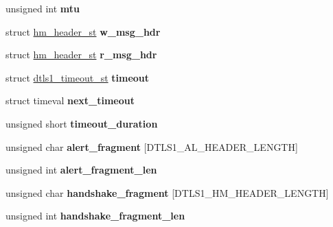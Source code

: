\begin{DoxyCompactItemize}
unsigned int {\bfseries mtu}
\item 
\mbox{\label{structdtls1__state__st_aa16e59d7f125177caa2b5939fcb13890}} 
struct \hyperlink{structhm__header__st}{hm\+\_\+header\+\_\+st} {\bfseries w\+\_\+msg\+\_\+hdr}
\item 
\mbox{\label{structdtls1__state__st_a1c6a7daa242306285d142a607d0a63b1}} 
struct \hyperlink{structhm__header__st}{hm\+\_\+header\+\_\+st} {\bfseries r\+\_\+msg\+\_\+hdr}
\item 
\mbox{\label{structdtls1__state__st_af619339c285b02986b695f6d505f1c36}} 
struct \hyperlink{structdtls1__timeout__st}{dtls1\+\_\+timeout\+\_\+st} {\bfseries timeout}
\item 
\mbox{\label{structdtls1__state__st_a499a60c3bed45a4de6da508430035578}} 
struct timeval {\bfseries next\+\_\+timeout}
\item 
\mbox{\label{structdtls1__state__st_ad5deca28499d48a4faa5fae12f621d93}} 
unsigned short {\bfseries timeout\+\_\+duration}
\item 
\mbox{\label{structdtls1__state__st_a7fc037708d5e02c3b7e401aa06bf8df9}} 
unsigned char {\bfseries alert\+\_\+fragment} \mbox{[}D\+T\+L\+S1\+\_\+\+A\+L\+\_\+\+H\+E\+A\+D\+E\+R\+\_\+\+L\+E\+N\+G\+TH\mbox{]}
\item 
\mbox{\label{structdtls1__state__st_afc29db2cfa1741bc83934534a82c9c99}} 
unsigned int {\bfseries alert\+\_\+fragment\+\_\+len}
\item 
\mbox{\label{structdtls1__state__st_a1fca455e80d0a3036c79d9209ac51633}} 
unsigned char {\bfseries handshake\+\_\+fragment} \mbox{[}D\+T\+L\+S1\+\_\+\+H\+M\+\_\+\+H\+E\+A\+D\+E\+R\+\_\+\+L\+E\+N\+G\+TH\mbox{]}
\item 
\mbox{\label{structdtls1__state__st_abeb5303866e89417b37551332cf28f08}} 
unsigned int {\bfseries handshake\+\_\+fragment\+\_\+len}
\item 
\mbox{\label{structdtls1__state__st_a55559920472b96c76fbe4b1bf83c62e5}} 

\end{DoxyCompactItemize}
